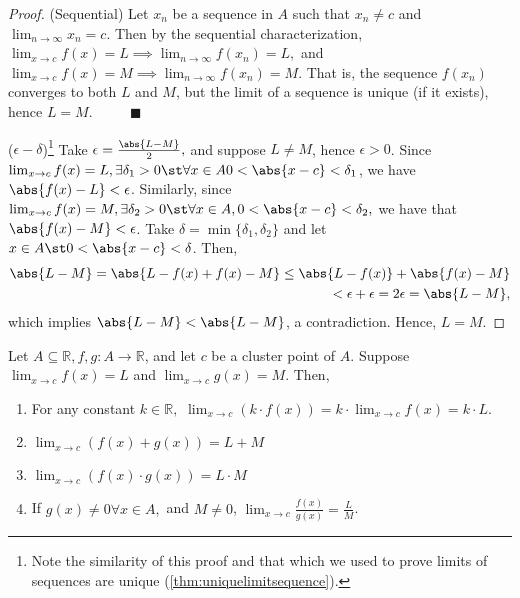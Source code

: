 \documentclass[12pt]{article}
\renewcommand{\qedsymbol}{$\blacksquare$}
\begin{document}
\begin{proof}(Sequential) Let $x_n$ be a sequence in $A$ such that $x_n \neq c$ and $\lim_{n\to\infty} x_n = c$. Then by the sequential characterization, $\lim_{x\to c} f(x) = L \implies \lim_{n\to\infty} f(x_n) = L,$ and $\lim_{x\to c} f(x) = M \implies \lim_{n\to \infty} f(x_n) = M$. That is, the sequence $f(x_n)$ converges to both $L$ and $M$, but the limit of a sequence is unique (if it exists), hence $L = M$. $\qquad$ \qedsymbol

\noindent($\epsilon-\delta$)\footnote{Note the similarity of this proof and that which we used to prove limits of sequences are unique (\cref{thm:uniquelimitsequence}).} Take $\epsilon = \frac{\abs{L - M}}{2},$ and suppose $L \neq M$, hence $\epsilon > 0$. Since $\lim_{x\to c}f(x) = L, \exists \delta_1 > 0 \st \forall x \in A 0 < \abs{x - c} < \delta_1$, we have $\abs{f(x) - L} < \epsilon$. Similarly, since $\lim_{x \to c} f(x) = M, \exists \delta_2 > 0 \st \forall x \in A, 0 < \abs{x - c} < \delta_2,$ we have that $\abs{f(x) - M} < \epsilon$. Take $\delta = \min\{\delta_1, \delta_2 \}$ and let $x \in A \st 0 < \abs{x - c} < \delta$. Then, \begin{align*}
  \abs{L - M} = \abs{L - f(x) + f(x) - M} \leq \abs{L - f(x)} + \abs{f(x) - M} \\
  < \epsilon + \epsilon = 2 \epsilon = \abs{L - M},
\end{align*}
which implies $\abs{L - M} < \abs{L - M}$, a contradiction. Hence, $L = M$.
\end{proof}

\begin{theorem}\label{thm:algebraicpropfunctionallimit}
  Let $A \subseteq \mathbb{R}, f, g : A \to \mathbb{R}$, and let $c$ be a cluster point of $A$. Suppose $\lim_{x\to c} f(x) = L$ and $\lim_{x \to c} g(x) = M$. Then,
  \begin{enumerate}
    \item For any constant $k \in \mathbb{R},$ $
      \lim_{x \to c} (k \cdot f(x)) = k \cdot \lim_{x\to c} f(x) = k \cdot L.$
    \item $\lim_{x\to c}(f(x) + g(x)) = L + M$
    \item $\lim_{x\to c} (f(x) \cdot g(x)) = L \cdot M$
    \item If $g(x) \neq 0 \forall x \in A,$ and $M \neq 0$, $\lim_{x\to c} \frac{f(x)}{g(x)} = \frac{L}{M}$.
  \end{enumerate}
\end{theorem}
\end{document}
